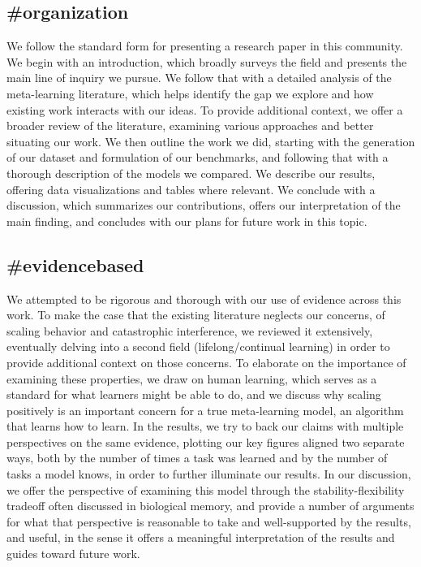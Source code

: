 \subsection{\#organization}
We follow the standard form for presenting a research paper in this community. We begin with an introduction, which broadly surveys the field and presents the main line of inquiry we pursue. We follow that with a detailed analysis of the meta-learning literature, which helps identify the gap we explore and how existing work interacts with our ideas. To provide additional context, we offer a broader review of the literature, examining various approaches and better situating our work. We then outline the work we did, starting with the generation of our dataset and formulation of our benchmarks, and following that with a thorough description of the models we compared. We describe our results, offering data visualizations and tables where relevant. We conclude with a discussion, which summarizes our contributions, offers our interpretation of the main finding, and concludes with our plans for future work in this topic. 

\subsection{\#evidencebased}
We attempted to be rigorous and thorough with our use of evidence across this work. To make the case that the existing literature neglects our concerns, of scaling behavior and catastrophic interference, we reviewed it extensively, eventually delving into a second field (lifelong/continual learning) in order to provide additional context on those concerns. To elaborate on the importance of examining these properties, we draw on human learning, which serves as a standard for what learners might be able to do, and we discuss why scaling positively is an important concern for a true meta-learning model, an algorithm that learns how to learn. In the results, we try to back our claims with multiple perspectives on the same evidence, plotting our key figures aligned two separate ways, both by the number of times a task was learned and by the number of tasks a model knows, in order to further illuminate our results. In our discussion, we offer the perspective of examining this model through the stability-flexibility tradeoff often discussed in biological memory, and provide a number of arguments for what that perspective is reasonable to take and well-supported by the results, and useful, in the sense it offers a meaningful interpretation of the results and guides toward future work. 
